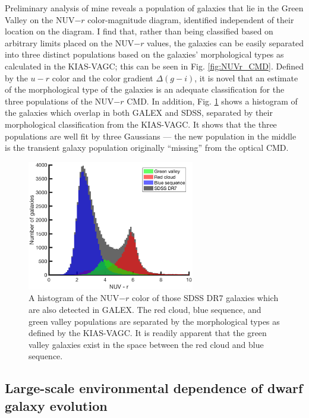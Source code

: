 Preliminary analysis of mine reveals a population of galaxies that lie in the 
Green Valley on the NUV$-r$ color-magnitude diagram, identified independent of 
their location on the diagram.  I find that, rather than being 
classified based on arbitrary limits placed on the NUV$-r$ values, the galaxies 
can be easily separated into three distinct populations based on the galaxies' 
morphological types as calculated in the KIAS-VAGC; this can be seen in Fig. 
\ref{fig:NUVr_CMD}.  Defined by the $u-r$ color and the color gradient 
$\Delta (g-i)$, it is novel that an estimate of the morphological type of the 
galaxies is an adequate classification for the three populations of the NUV$-r$ 
CMD.  In addition, Fig. \ref{fig:NUVr_hist} shows a histogram of the galaxies 
which overlap in both GALEX and SDSS, separated by their morphological 
classification from the KIAS-VAGC.  It shows that the three populations are well 
fit by three Gaussians --- the new population in the middle is the transient 
galaxy population originally ``missing'' from the optical CMD.

\begin{figure}
    \includegraphics[width=0.65\textwidth]{Images/GV/NUVr_CMDclassifications}
    \caption[Distribution of NUV-$r$ of SDSS galaxies]{A histogram of the 
    NUV$-r$ color of those SDSS DR7 galaxies which are also detected in GALEX.  
    The red cloud, blue sequence, and green valley populations are separated by 
    the morphological types as defined by the KIAS-VAGC.  It is readily apparent 
    that the green valley galaxies exist in the space between the red cloud and 
    blue sequence.}
    \label{fig:NUVr_hist}
\end{figure}



\subsection{Large-scale environmental dependence of dwarf galaxy evolution}


